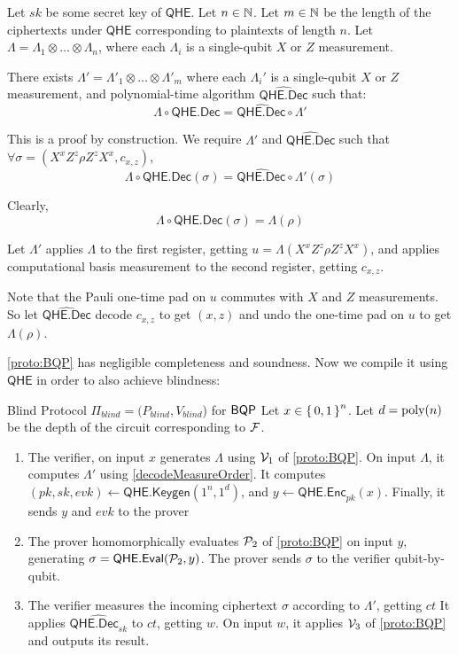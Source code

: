 \begin{thm}
	\label{decodeMeasureOrder}
	Let $sk$ be some secret key of $\mathsf{QHE}$.
	Let $n\in\mathbb{N}$.
	Let $m\in\mathbb{N}$ be the length of the ciphertexts under $\mathsf{QHE}$ corresponding to plaintexts of length $n$.
	Let $\Lambda=\Lambda_1\otimes\ldots\otimes\Lambda_n$, where each $\Lambda_i$ is a single-qubit $X$ or $Z$ measurement.

	There exists $\Lambda'=\Lambda'_1\otimes\ldots\otimes\Lambda'_m$ where each $\Lambda_i'$ is a single-qubit $X$ or $Z$ measurement, and polynomial-time algorithm $\widehat{\mathsf{QHE.Dec}}$ such that:
	$$\Lambda\circ\mathsf{QHE.Dec}=\widehat{\mathsf{QHE.Dec}}\circ\Lambda'$$
\end{thm}
\begin{prf}
	This is a proof by construction.
	We require $\Lambda'$ and $\widehat{\mathsf{QHE.Dec}}$ such that $\forall\sigma=(X^xZ^z\rho Z^zX^x, c_{x,z})$,
	$$\Lambda\circ\mathsf{QHE.Dec}(\sigma)=\widehat{\mathsf{QHE.Dec}}\circ\Lambda'(\sigma)$$

	Clearly,
	$$\Lambda\circ\mathsf{QHE.Dec}(\sigma)=\Lambda(\rho)$$
	
	Let $\Lambda'$ applies $\Lambda$ to the first register, getting $u=\Lambda(X^xZ^z\rho Z^zX^x)$, and applies computational basis measurement to the second register, getting $c_{x, z}$.

	Note that the Pauli one-time pad on $u$ commutes with $X$ and $Z$ measurements.
	So let $\widehat{\mathsf{QHE.Dec}}$ decode $c_{x, z}$ to get $(x, z)$ and undo the one-time pad on $u$ to get $\Lambda(\rho)$.
\end{prf}

\cref{proto:BQP} has negligible completeness and soundness.
Now we compile it using $\mathsf{QHE}$ in order to also achieve blindness:


\begin{protocol}{Blind Protocol $\Pi_{blind} = (P_{blind}, V_{blind}$) for $\operatorname{\mathsf{BQP}}$ }
	\label{proto:BlindBQP}
	Let $x\in\set{0,1}^n$.
	Let $d=\operatorname*{\operatorname{poly}}(n)$ be the depth of the circuit corresponding to $\mathcal{F}$.
	\begin{enumerate}
		\item The verifier, on input $x$ generates $\Lambda$ using $\mathcal{V}_1$ of \cref{proto:BQP}.
			On input $\Lambda$, it computes $\Lambda'$ using \cref{decodeMeasureOrder}.
			It computes $(pk, sk, evk)\leftarrow\mathsf{QHE.Keygen}(1^n, 1^d)$, and $y\leftarrow\mathsf{QHE.Enc}_{pk}(x)$.
			Finally, it sends $y$ and $evk$ to the prover
		\item The prover homomorphically evaluates $\mathcal{P}_2$ of \cref{proto:BQP} on input $y$, generating $\sigma=\mathsf{QHE.Eval}(\mathcal{P}_2, y)$.
			The prover sends $\sigma$ to the verifier qubit-by-qubit.
		\item The verifier measures the incoming ciphertext $\sigma$ according to $\Lambda'$, getting $ct$
			It applies $\widehat{\mathsf{QHE.Dec}_{sk}}$ to $ct$, getting $w$.
			On input $w$, it applies $\mathcal{V}_3$ of \cref{proto:BQP} and outputs its result.
	\end{enumerate}
\end{protocol}

